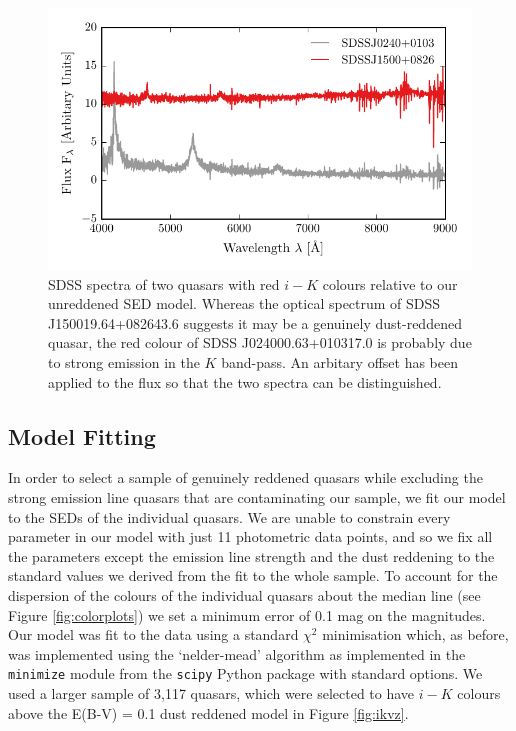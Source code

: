 \begin{figure}
  \centering
  \includegraphics[width=\textwidth]{figures/chapter06/red_spectra.pdf}
  \caption{SDSS spectra of two quasars with red $i-K$ colours relative to our unreddened SED model. Whereas the optical spectrum of SDSS J150019.64+082643.6 suggests it may be a genuinely dust-reddened quasar, the red colour of SDSS J024000.63+010317.0 is probably due to strong \ha emission in the $K$ band-pass. An arbitary offset has been applied to the flux so that the two spectra can be distinguished.}
  \label{fig:spectra}
\end{figure}

\subsection{Model Fitting}

In order to select a sample of genuinely reddened quasars while excluding the strong emission line quasars that are contaminating our sample, we fit our model to the SEDs of the individual quasars. 
We are unable to constrain every parameter in our model with just 11 photometric data points, and so we fix all the parameters except the emission line strength and the dust reddening to the standard values we derived from the fit to the whole sample. 
To account for the dispersion of the colours of the individual quasars about the median line (see Figure \ref{fig:colorplots}) we set a minimum error of 0.1 mag on the magnitudes. 
Our model was fit to the data using a standard $\chi^2$ minimisation which, as before, was implemented using the `nelder-mead' algorithm as implemented in the {\tt minimize} module from the {\tt scipy} Python package with standard options. 
We used a larger sample of 3,117 quasars, which were selected to have $i-K$ colours above the E(B-V) = 0.1 dust reddened model in Figure \ref{fig:ikvz}. 


